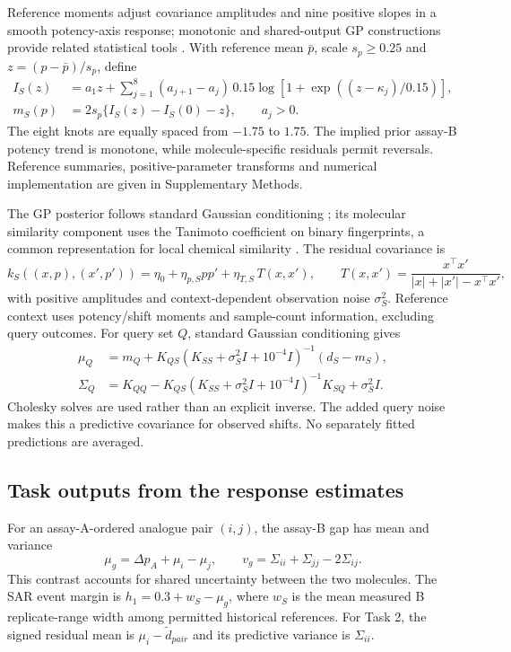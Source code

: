 \documentclass[letterpaper]{article}
\begin{document}
Reference moments adjust covariance amplitudes and nine positive slopes in a smooth potency-axis response; monotonic and shared-output GP constructions provide related statistical tools \citep{riihimaki2010monotone,bonilla2008multitaskgp}. With reference mean $\bar p$, scale $s_p\geq0.25$ and $z=(p-\bar p)/s_p$, define
\begin{align}
 I_S(z)&=a_1z+\sum_{j=1}^{8}(a_{j+1}-a_j)\,0.15\log[1+\exp((z-\kappa_j)/0.15)],\\
 m_S(p)&=2s_p\{I_S(z)-I_S(0)-z\},\qquad a_j>0.
\end{align}
The eight knots are equally spaced from $-1.75$ to $1.75$. The implied prior assay-B potency trend is monotone, while molecule-specific residuals permit reversals. Reference summaries, positive-parameter transforms and numerical implementation are given in Supplementary Methods.

The GP posterior follows standard Gaussian conditioning \citep{rasmussen2006gp}; its molecular similarity component uses the Tanimoto coefficient on binary fingerprints, a common representation for local chemical similarity \citep{ralaivola2005kernels,difranzo2020nngp,tripp2023tanimoto}. The residual covariance is
\begin{equation}
 k_S((x,p),(x',p'))=\eta_0+\eta_{p,S}pp'+\eta_{T,S}\,T(x,x'),\qquad
 T(x,x')=\frac{x^\top x'}{|x|+|x'|-x^\top x'},
\end{equation}
with positive amplitudes and context-dependent observation noise $\sigma_S^2$. Reference context uses potency/shift moments and sample-count information, excluding query outcomes. For query set $Q$, standard Gaussian conditioning gives
\begin{align}
 \mu_Q&=m_Q+K_{QS}(K_{SS}+\sigma_S^2I+10^{-4}I)^{-1}(d_S-m_S),\\
 \Sigma_Q&=K_{QQ}-K_{QS}(K_{SS}+\sigma_S^2I+10^{-4}I)^{-1}K_{SQ}+\sigma_S^2I.
\end{align}
Cholesky solves are used rather than an explicit inverse. The added query noise makes this a predictive covariance for observed shifts. No separately fitted predictions are averaged.

\subsection{Task outputs from the response estimates}

For an assay-A-ordered analogue pair $(i,j)$, the assay-B gap has mean and variance
\begin{equation}
 \mu_g=\Delta p_A+\mu_i-\mu_j,\qquad
 v_g=\Sigma_{ii}+\Sigma_{jj}-2\Sigma_{ij}.
\end{equation}
This contrast accounts for shared uncertainty between the two molecules. The SAR event margin is $h_1=0.3+w_S-\mu_g$, where $w_S$ is the mean measured B replicate-range width among permitted historical references. For Task 2, the signed residual mean is $\mu_i-\widetilde d_{pair}$ and its predictive variance is $\Sigma_{ii}$.
\end{document}
